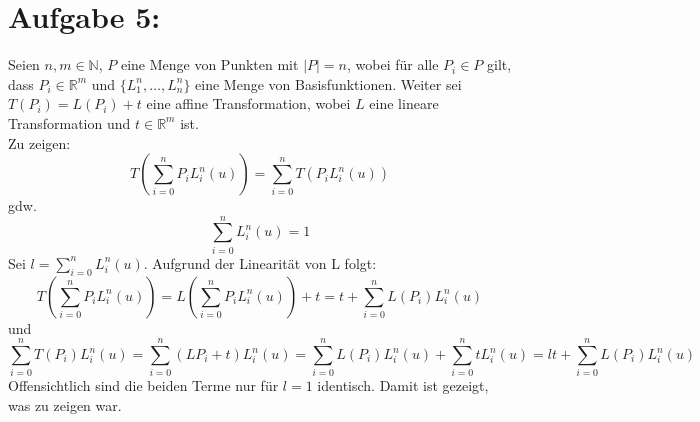 \section*{Aufgabe 5: }
Seien $n, m \in \mathbb{N}$, $P$ eine Menge von Punkten mit $|P| = n$, wobei für alle $P_i \in P$ gilt, dass $P_i \in \mathbb{R}^m$ und $\{L_1^n, \hdots, L_n^n\}$ eine Menge von Basisfunktionen. Weiter sei $T(P_i) = L(P_i) + t$ eine affine Transformation, wobei $L$ eine lineare Transformation und $t \in \mathbb{R}^m$ ist.\\
Zu zeigen:
$$
T\left(\sum_{i=0}^{n}P_iL_i^n(u)\right) = \sum_{i=0}^{n}T\left(P_iL_i^n(u)\right)
$$
gdw.
$$
\sum_{i=0}^{n}L_i^n(u) = 1 
$$
Sei $l = \sum_{i=0}^{n}L_i^n(u)$. Aufgrund der Linearität von L folgt:
$$
T\left(\sum_{i=0}^{n}P_iL_i^n(u)\right) = L\left(\sum_{i=0}^{n}P_iL_i^n(u)\right) + t = t + \sum_{i=0}^{n}L(P_i)L_i^n(u)
$$
und
$$
\sum_{i=0}^{n}T(P_i)L_i^n(u) = \sum_{i=0}^{n}(LP_i + t)L_i^n(u) = \sum_{i=0}^{n}L(P_i)L_i^n(u) + \sum_{i=0}^{n}tL_i^n(u) = lt + \sum_{i=0}^{n}L(P_i)L_i^n(u)
$$
Offensichtlich sind die beiden Terme nur für $l = 1$ identisch. Damit ist gezeigt, was zu zeigen war.
